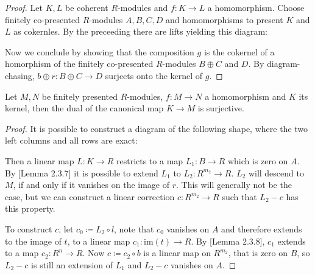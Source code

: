 \begin{proof}
  Let $K,L$ be coherent $R$-modules and $f:K\to L$ a homomorphism.
  Choose finitely co-presented $R$-modules $A,B,C,D$ and homomorphisms to present $K$ and $L$ as cokernles.
  By the preceeding  there are lifts yielding this diagram:
  \begin{center}
  \end{center}
  Now we conclude by showing that the composition $g$ is the cokernel of a homorphism of the finitely co-presented $R$-modules $B\oplus C$ and $D$.
  By diagram-chasing, $b\oplus r:B\oplus C\to D$ surjects onto the kernel of $g$.
\end{proof}

\begin{lemma}
  \label{fp-kernel-dual-surjective}
  Let $M,N$ be finitely presented $R$-modules, $f:M\to N$ a homomorphism and $K$ its kernel,
  then the dual of the canonical map $K\to M$ is surjective.
\end{lemma}

\begin{proof}
  It is possible  to construct a diagram of the following shape, where the two left columns and all rows are exact:
  \begin{center}
  \end{center}
  Then a linear map $L:K\to R$ restricts to a map $L_1:B\to R$ which is zero on $A$.
  By \cite{diffgeo-article}[Lemma 2.3.7] it is possible to extend $L_1$ to $L_2:R^{m_2}\to R$.
  $L_2$ will descend to $M$, if and only if it vanishes on the image of $r$.
  This will generally not be the case, but we can construct a linear correction $c:R^{m_2}\to R$ such that $L_2-c$ has this property.

  To construct $c$, let $c_0\coloneq L_2\circ l$, note that $c_0$ vanishes on $A$ and therefore extends to the image of $t$, to a linear map $c_1:\mathrm{im}(t)\to R$.
  By \cite{diffgeo-article}[Lemma 2.3.8], $c_1$ extends to a map $c_2:R^{n}\to R$.
  Now $c\coloneq c_2\circ b$ is a linear map on $R^{m_2}$, that is zero on $B$,
  so $L_2-c$ is still an extension of $L_1$ and $L_2-c$ vanishes on $A$.
\end{proof}

